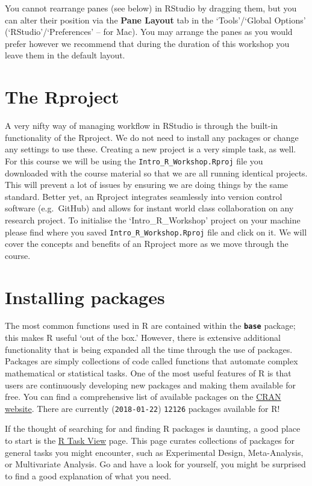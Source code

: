 \documentclass[]{book}
\theoremstyle{definition}
\theoremstyle{definition}
\theoremstyle{definition}
\theoremstyle{remark}
\begin{document}
You cannot rearrange panes (see below) in RStudio by dragging them, but
you can alter their position via the \textbf{Pane Layout} tab in the
`Tools'/`Global Options' (`RStudio'/`Preferences' -- for Mac). You may
arrange the panes as you would prefer however we recommend that during
the duration of this workshop you leave them in the default layout.

\section{The Rproject}\label{the-rproject}

A very nifty way of managing workflow in RStudio is through the built-in
functionality of the Rproject. We do not need to install any packages or
change any settings to use these. Creating a new project is a very
simple task, as well. For this course we will be using the
\texttt{Intro\_R\_Workshop.Rproj} file you downloaded with the course
material so that we are all running identical projects. This will
prevent a lot of issues by ensuring we are doing things by the same
standard. Better yet, an Rproject integrates seamlessly into version
control software (e.g.~GitHub) and allows for instant world class
collaboration on any research project. To initialise the
`Intro\_R\_Workshop' project on your machine please find where you saved
\texttt{Intro\_R\_Workshop.Rproj} file and click on it. We will cover
the concepts and benefits of an Rproject more as we move through the
course.

\section{Installing packages}\label{installing-packages}

The most common functions used in R are contained within the
\textbf{\texttt{base}} package; this makes R useful `out of the box.'
However, there is extensive additional functionality that is being
expanded all the time through the use of packages. Packages are simply
collections of code called functions that automate complex mathematical
or statistical tasks. One of the most useful features of R is that users
are continuously developing new packages and making them available for
free. You can find a comprehensive list of available packages on the
\href{https://cran.r-project.org/web/packages/}{CRAN website}. There are
currently (\texttt{2018-01-22}) \texttt{12126} packages available for R!

If the thought of searching for and finding R packages is daunting, a
good place to start is the \href{http://cran.r-project.org/web/views/}{R
Task View} page. This page curates collections of packages for general
tasks you might encounter, such as Experimental Design, Meta-Analysis,
or Multivariate Analysis. Go and have a look for yourself, you might be
surprised to find a good explanation of what you need.
\end{document}
